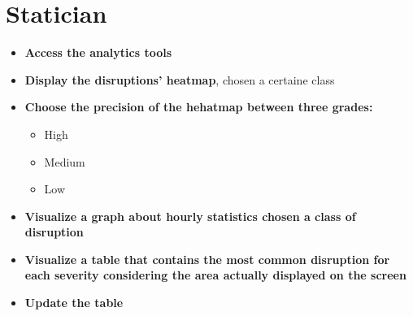 \section{Statician}
\begin{itemize}
	\item \textbf{Access the analytics tools}
	\item \textbf{Display the disruptions' heatmap}, chosen a certaine class
	\item \textbf{Choose the precision of the hehatmap between three grades:}
		\begin{itemize}
		\item High
		\item Medium
		\item Low
		\end{itemize}
	\item \textbf{Visualize a graph about hourly statistics chosen a class of disruption}
	\item \textbf{Visualize a table that contains the most common disruption for each severity considering the area actually displayed on the screen}
	\item \textbf{Update the table}
\end{itemize}








